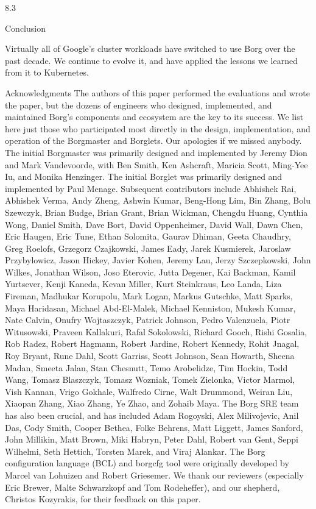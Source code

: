 8.3

Conclusion

Virtually all of Google’s cluster workloads have switched to
use Borg over the past decade. We continue to evolve it, and
have applied the lessons we learned from it to Kubernetes.

Acknowledgments
The authors of this paper performed the evaluations and
wrote the paper, but the dozens of engineers who designed, implemented, and maintained Borg’s components
and ecosystem are the key to its success. We list here just
those who participated most directly in the design, implementation, and operation of the Borgmaster and Borglets.
Our apologies if we missed anybody.
The initial Borgmaster was primarily designed and implemented by Jeremy Dion and Mark Vandevoorde, with
Ben Smith, Ken Ashcraft, Maricia Scott, Ming-Yee Iu, and
Monika Henzinger. The initial Borglet was primarily designed and implemented by Paul Menage.
Subsequent contributors include Abhishek Rai, Abhishek
Verma, Andy Zheng, Ashwin Kumar, Beng-Hong Lim,
Bin Zhang, Bolu Szewczyk, Brian Budge, Brian Grant,
Brian Wickman, Chengdu Huang, Cynthia Wong, Daniel
Smith, Dave Bort, David Oppenheimer, David Wall, Dawn
Chen, Eric Haugen, Eric Tune, Ethan Solomita, Gaurav Dhiman, Geeta Chaudhry, Greg Roelofs, Grzegorz Czajkowski,
James Eady, Jarek Kusmierek, Jaroslaw Przybylowicz, Jason Hickey, Javier Kohen, Jeremy Lau, Jerzy Szczepkowski,
John Wilkes, Jonathan Wilson, Joso Eterovic, Jutta Degener, Kai Backman, Kamil Yurtsever, Kenji Kaneda, Kevan Miller, Kurt Steinkraus, Leo Landa, Liza Fireman,
Madhukar Korupolu, Mark Logan, Markus Gutschke, Matt
Sparks, Maya Haridasan, Michael Abd-El-Malek, Michael
Kenniston, Mukesh Kumar, Nate Calvin, Onufry Wojtaszczyk,
Patrick Johnson, Pedro Valenzuela, Piotr Witusowski, Praveen
Kallakuri, Rafal Sokolowski, Richard Gooch, Rishi Gosalia, Rob Radez, Robert Hagmann, Robert Jardine, Robert
Kennedy, Rohit Jnagal, Roy Bryant, Rune Dahl, Scott Garriss, Scott Johnson, Sean Howarth, Sheena Madan, Smeeta
Jalan, Stan Chesnutt, Temo Arobelidze, Tim Hockin, Todd
Wang, Tomasz Blaszczyk, Tomasz Wozniak, Tomek Zielonka,
Victor Marmol, Vish Kannan, Vrigo Gokhale, Walfredo
Cirne, Walt Drummond, Weiran Liu, Xiaopan Zhang, Xiao
Zhang, Ye Zhao, and Zohaib Maya.
The Borg SRE team has also been crucial, and has included Adam Rogoyski, Alex Milivojevic, Anil Das, Cody
Smith, Cooper Bethea, Folke Behrens, Matt Liggett, James
Sanford, John Millikin, Matt Brown, Miki Habryn, Peter Dahl, Robert van Gent, Seppi Wilhelmi, Seth Hettich,
Torsten Marek, and Viraj Alankar. The Borg configuration
language (BCL) and borgcfg tool were originally developed
by Marcel van Lohuizen and Robert Griesemer.
We thank our reviewers (especially Eric Brewer, Malte
Schwarzkopf and Tom Rodeheffer), and our shepherd, Christos Kozyrakis, for their feedback on this paper.


